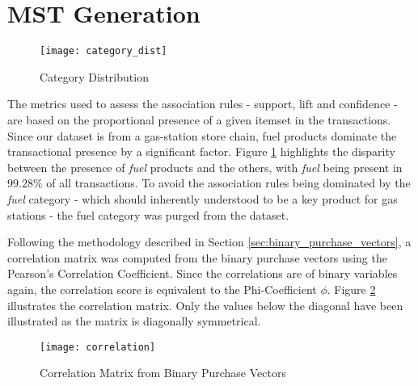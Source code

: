 \section{MST Generation}
\begin{figure}[H]
\centering
\texttt{[image: category\_dist]}
\caption{Category Distribution}
\label{fig:cat_dist}
\end{figure}
The metrics used to assess the association rules - support, lift and confidence - are based on the proportional presence of a given itemset in the transactions. Since our dataset is from a gas-station store chain, fuel products dominate the transactional presence by a significant factor. Figure \ref{fig:cat_dist} highlights the disparity between the presence of \textit{fuel} products and the others, with \textit{fuel} being present in $99.28\%$ of all transactions. To avoid the association rules being dominated by the \textit{fuel} category - which should inherently understood to be a key product for gas stations - the fuel category was purged from the dataset.


Following the methodology described in Section \ref{sec:binary_purchase_vectors}, a correlation matrix was computed from the binary purchase vectors using the Pearson's Correlation Coefficient. Since the correlations are of binary variables again, the correlation score is equivalent to the Phi-Coefficient $\phi$. Figure \ref{fig:correlation} illustrates the correlation matrix. Only the values below the diagonal have been illustrated as the matrix is diagonally symmetrical.





\begin{figure}[H]
\centering
\texttt{[image: correlation]}
\caption{Correlation Matrix from Binary Purchase Vectors}
\label{fig:correlation}
\end{figure}

